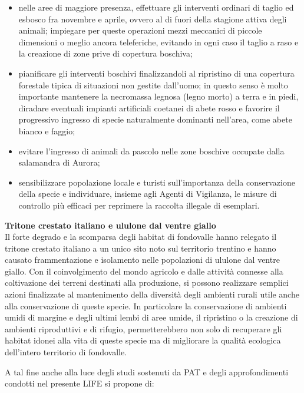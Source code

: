 \documentclass[10pt,twoside,openany,x11names,svgnames,italian,a5paper,dvipsnames,table]{memoir}
\begin{document}
\begin{itemize}\itemsep0pt
  \item nelle aree di maggiore presenza, effettuare gli interventi ordinari di taglio ed esbosco fra novembre e aprile, ovvero al di fuori della stagione attiva degli animali; impiegare per queste operazioni mezzi meccanici di piccole dimensioni o meglio ancora teleferiche, evitando in ogni caso il taglio a raso e la creazione di zone prive di copertura boschiva;
  \item pianificare gli interventi boschivi finalizzandoli al ripristino di una copertura forestale tipica di situazioni non gestite dall’uomo; in questo senso è molto importante mantenere la necromassa legnosa (legno morto) a terra e in piedi, diradare eventuali impianti artificiali coetanei di abete rosso e favorire il progressivo ingresso di specie naturalmente dominanti nell’area, come abete bianco e faggio;
  \item evitare l’ingresso di animali da pascolo nelle zone boschive occupate dalla salamandra di Aurora;
  \item sensibilizzare popolazione locale e turisti sull’importanza della conservazione della specie e individuare, insieme agli Agenti di Vigilanza, le misure di controllo più efficaci per reprimere la raccolta illegale di esemplari.
\end{itemize}
\vspace{.2cm}
\textbf{Tritone crestato italiano e ululone dal ventre giallo}\\
Il forte degrado e la scomparsa degli habitat di fondovalle hanno relegato il tritone crestato italiano a un unico sito noto sul territorio trentino e hanno causato frammentazione e isolamento nelle popolazioni di ululone dal ventre giallo. Con il coinvolgimento del mondo agricolo e dalle attività connesse alla coltivazione dei terreni destinati alla produzione, si possono realizzare semplici azioni finalizzate al mantenimento della diversità degli ambienti rurali utile anche alla conservazione di queste specie. In particolare la conservazione di ambienti umidi di margine e degli ultimi lembi di aree umide, il ripristino o la creazione di ambienti riproduttivi e di rifugio, permetterebbero non solo di recuperare gli habitat idonei alla vita di queste specie ma di migliorare la qualità ecologica dell’intero territorio di fondovalle.

A tal fine anche alla luce degli studi sostenuti da PAT e degli approfondimenti condotti nel presente LIFE si propone di:
\end{document}

